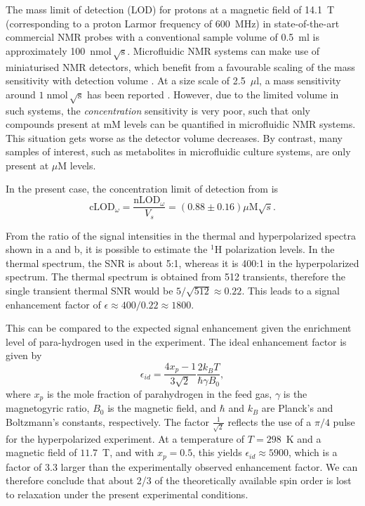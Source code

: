 The mass limit of detection (LOD) for
protons at a magnetic field of 14.1~T (corresponding to a proton Larmor frequency
of 600~MHz) in state-of-the-art commercial NMR probes with a
conventional sample volume of 0.5~ml is approximately
100~$\text{nmol}\,\sqrt{\text{s}}$.
Microfluidic NMR systems can make use of miniaturised NMR detectors,
which benefit from a favourable scaling of the mass sensitivity
with detection volume \cite{Olson:1995vu,Badilita:2011td,Zalesskiy:2014hi}. At a size scale
of 2.5~$\mu\mathrm{l}$, a mass sensitivity around
$1\;\text{nmol}\,\sqrt{\text{s}}$
has been reported \cite{Finch:2016gv}.
However, due to the limited volume in such systems,
the \emph{concentration} sensitivity is very poor, such that
only compounds present at mM levels can be quantified
in microfluidic NMR systems. This situation gets worse as the detector
volume decreases. By contrast, many samples of interest, such as
metabolites in microfluidic culture systems, are only present
at $\mu$M levels.

In the present
case, the concentration limit of detection from  is
\begin{equation}
\text{cLOD}_\omega =
\frac{\text{nLOD}_\omega}{V_s} = (0.88 ± 0.16)\mu\text{M}\sqrt{s}.
\end{equation}

From the ratio of the signal intensities in the thermal and hyperpolarized
spectra shown in a and b, it is possible to estimate the
$\mathrm{^1H}$ polarization levels. In the thermal spectrum, the SNR is about
5:1, whereas it is 400:1 in the hyperpolarized spectrum. The thermal spectrum is
obtained from 512 transients, therefore the single transient thermal SNR would
be $5/\sqrt{512}\approx 0.22$. This leads to a signal enhancement factor of
$\epsilon\approx 400/0.22 \approx 1800$.

This can be compared to the expected signal enhancement given the enrichment
level of para-hydrogen used in the experiment. The ideal enhancement factor is
given by
\begin{equation}
	\epsilon_{id} =\frac{4x_p-1}{3\sqrt{2}} \frac{2 k_BT}{\hbar \gamma B_0},
\end{equation}
where $x_p$ is the mole fraction of parahydrogen in the feed gas, $\gamma$ is
the magnetogyric ratio, $B_0$ is the magnetic field, and $\hbar$ and $k_B$ are
Planck's and Boltzmann's constants, respectively.
The factor $\frac{1}{\sqrt{2}}$ reflects the use of a $\pi/4$ pulse for the
hyperpolarized experiment. At a temperature of $T=298$~K
and a magnetic field of $11.7$~T, and with $x_p=0.5$, this yields
$\epsilon_{id}\approx 5900$, which is a factor of 3.3 larger than the
experimentally observed enhancement factor. We can therefore conclude that
about 2/3 of the theoretically available spin order is lost to relaxation under
the present experimental conditions.

